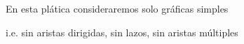 \documentclass[beamer]{standalone}
\begin{document}
\begin{standaloneframe}[plain]

  En esta plática consideraremos solo gráficas simples

  \vspace{0.7cm}

  \pause
  {\normalsize\color{purple} i.e. sin aristas dirigidas, sin lazos, sin aristas
    múltiples}
\end{standaloneframe}
\end{document}
